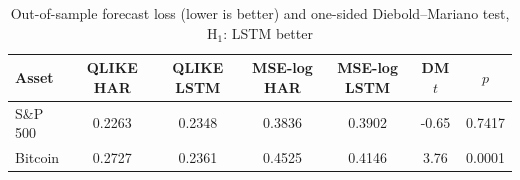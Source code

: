 \begin{table}[H]
\centering
\caption{Out-of-sample forecast loss (lower is better) and one-sided Diebold--Mariano test, H$_1$: LSTM better}
\begin{tabular}{lcccccc}
\toprule
Asset & QLIKE HAR & QLIKE LSTM & MSE-log HAR & MSE-log LSTM & DM $t$ & $p$ \\
\midrule
S\&P 500 & 0.2263 & 0.2348 & 0.3836 & 0.3902 & -0.65 & 0.7417 \\
Bitcoin & 0.2727 & 0.2361 & 0.4525 & 0.4146 & 3.76 & 0.0001 \\
\bottomrule
\end{tabular}
\end{table}
